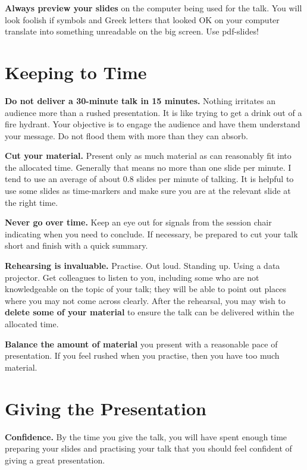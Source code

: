 \documentclass[]{book}
\theoremstyle{definition}
\theoremstyle{definition}
\theoremstyle{definition}
\theoremstyle{remark}
\begin{document}
\textbf{Always preview your slides} on the computer being
used for the talk. You will look foolish if symbols
and Greek letters that looked OK on your computer
translate into something unreadable on the big
screen. Use pdf-slides!

\hypertarget{keeping-to-time}{%
\section{Keeping to Time}\label{keeping-to-time}}

\textbf{Do not deliver a 30-minute talk in 15 minutes.} Nothing
irritates an audience more than a rushed presentation.
It is like trying to get a drink out of a fire hydrant.
Your objective is to engage the audience and
have them understand your message. Do not flood
them with more than they can absorb.

\textbf{Cut your material.} Present only as much material as can reasonably
fit into the allocated time. Generally that means no
more than one slide per minute. I tend to use an average
of about 0.8 slides per minute of talking. It is
helpful to use some slides as time-markers and make
sure you are at the relevant slide at the right time.

\textbf{Never go over time.} Keep an eye out for signals
from the session chair indicating when you need to
conclude. If necessary, be prepared to cut your talk
short and finish with a quick summary.

\textbf{Rehearsing is invaluable.} Practise. Out loud.
Standing up. Using a data projector. Get colleagues
to listen to you, including some who are not knowledgeable
on the topic of your talk; they will be able
to point out places where you may not come across
clearly. After the rehearsal, you may wish to
\textbf{delete some of your material} to ensure the talk can be delivered
within the allocated time.

\textbf{Balance the amount of material} you present with
a reasonable pace of presentation. If you feel rushed
when you practise, then you have too much material.

\hypertarget{giving-the-presentation}{%
\section{Giving the Presentation}\label{giving-the-presentation}}

\textbf{Confidence.} By the time you give the talk, you will have spent
enough time preparing your slides and practising
your talk that you should feel confident of giving a
great presentation.
\end{document}
